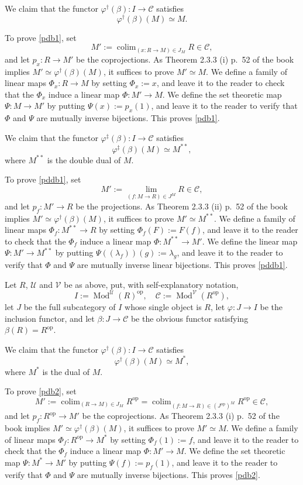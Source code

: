 \documentclass[12pt]{article}
\theoremstyle{remark}
\theoremstyle{definition}
\newcommand{\C}{\mathcal C}
\newcommand{\U}{\mathcal U}
\newcommand{\V}{\mathcal V}
\newcommand{\pp}{\varphi}
\DeclareMathOperator*{\colim}{colim}
\DeclareMathOperator{\Mod}{Mod}
\DeclareMathOperator{\op}{op}
\begin{document}
We claim that the functor $\pp^\dagger(\beta):I\to\C$ satisfies 
%
\begin{equation}\label{pdb1}
\pp^\dagger(\beta)(M)\simeq M.
\end{equation} 

To prove \eqref{pdb1}, set 
$$
M':=\colim_{(x:R\to M)\in J_M}R\in\C, 
$$ 
and let $p_x:R\to M'$ be the coprojections. As Theorem 2.3.3 (i) p.~52 of the book implies $M'\simeq\pp^\dagger(\beta)(M)$, it suffices to prove $M'\simeq M$. We define a family of linear maps $\Phi_x:R\to M$ by setting $\Phi_x:=x$, and leave it to the reader to check that the $\Phi_x$ induce a linear map $\Phi:M'\to M$. We define the set theoretic map $\Psi:M\to M'$ by putting $\Psi(x):=p_x(1)$, and leave it to the reader to verify that $\Phi$ and $\Psi$ are mutually inverse bijections. This proves \eqref{pdb1}. 

We claim that the functor $\pp^\ddagger(\beta):I\to\C$ satisfies 
%
\begin{equation}\label{pddb1}
\pp^\ddagger(\beta)(M)\simeq M^{**}, 
\end{equation} 
%
where $M^{**}$ is the double dual of $M$. 

To prove \eqref{pddb1}, set 
$$
M':=\lim_{(f:M\to R)\in J^M}R\in\C, 
$$ 
and let $p_f:M'\to R$ be the projections. As Theorem 2.3.3 (ii) p.~52 of the book implies $M'\simeq\pp^\dagger(\beta)(M)$, it suffices to prove $M'\simeq M^{**}$. We define a family of linear maps $\Phi_f:M^{**}\to R$ by setting $\Phi_f(F):=F(f)$, and leave it to the reader to check that the $\Phi_f$ induce a linear map $\Phi:M^{**}\to M'$. We define the linear map $\Psi:M'\to M^{**}$ by putting $\Psi((\lambda_f))(g):=\lambda_g$, and leave it to the reader to verify that $\Phi$ and $\Psi$ are mutually inverse linear bijections. This proves \eqref{pddb1}. 

Let $R$, $\U$ and $\V$ be as above, put, with self-explanatory notation, 
$$
I:=\Mod^\U(R)^{\op},\quad\C:=\Mod^\V(R^{\op}),
$$ 
let $J$ be the full subcategory of $I$ whose single object is $R$, let $\pp:J\to I$ be the inclusion functor, and let $\beta:J\to\C$ be the obvious functor satisfying $\beta(R)=R^{\op}$. 

We claim that the functor $\pp^\dagger(\beta):I\to\C$ satisfies 
%
\begin{equation}\label{pdb2}
\pp^\dagger(\beta)(M)\simeq M^*,
\end{equation} 
%
where $M^*$ is the dual of $M$. 

To prove \eqref{pdb2}, set 
$$
M':=\colim_{(R\to M)\in J_M}R^{\op}=\colim_{(f:M\to R)\in(J^{\op})^M}R^{\op}\in\C, 
$$ 
and let $p_f:R^{\op}\to M'$ be the coprojections. As Theorem 2.3.3 (i) p.~52 of the book implies $M'\simeq\pp^\dagger(\beta)(M)$, it suffices to prove $M'\simeq M$. We define a family of linear maps $\Phi_f:R^{\op}\to M^*$ by setting $\Phi_f(1):=f$, and leave it to the reader to check that the $\Phi_f$ induce a linear map $\Phi:M'\to M$. We define the set theoretic map $\Psi:M^*\to M'$ by putting $\Psi(f):=p_f(1)$, and leave it to the reader to verify that $\Phi$ and $\Psi$ are mutually inverse bijections. This proves \eqref{pdb2}. 
\end{document}
